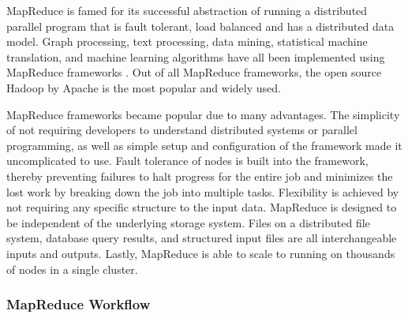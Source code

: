 \documentclass[12pt]{article}
\begin{document}
MapReduce is famed for its successful abstraction of running a distributed parallel program that is fault tolerant, load balanced and has a distributed data model. Graph processing, text processing, data mining, statistical machine translation, and machine learning algorithms have all been implemented using MapReduce frameworks \cite{dean2008mapreduce}. Out of all MapReduce frameworks, the open source Hadoop \cite{hadoop} by Apache is the most popular and widely used.

MapReduce frameworks became popular due to many advantages. The simplicity of not requiring developers to understand distributed systems or parallel programming, as well as simple setup and configuration of the framework made it uncomplicated to use. Fault tolerance of nodes is built into the framework, thereby preventing failures to halt progress for the entire job and minimizes the lost work by breaking down the job into multiple tasks. Flexibility is achieved by not requiring any specific structure to the input data. MapReduce is designed to be independent of the underlying storage system. Files on a distributed file system, database query results, and structured input files are all interchangeable inputs and outputs. Lastly, MapReduce is able to scale to running on thousands of nodes in a single cluster.


\subsubsection{MapReduce Workflow}
\end{document}
